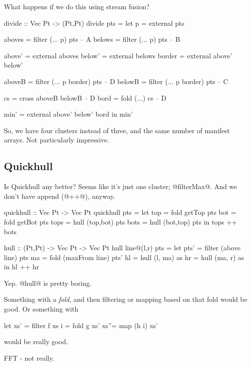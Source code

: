 What happens if we do this using stream fusion?
\begin{code}
divide :: Vec Pt -> (Pt,Pt)
divide pts
 = let p      = external pts

       aboves = filter (... p) pts          -- A
       belows = filter (... p) pts          -- B

       above' = external aboves
       below' = external belows
       border = external above' below'


       aboveB = filter (... p border) pts   -- D
       belowB = filter (... p border) pts   -- C

       cs     = cross  aboveB belowB        -- D
       bord   = fold   (...) cs             -- D

       min'   = external above' below' bord
   in  min'
\end{code}
So, we have four clusters instead of three, and the same number of manifest arrays. Not particularly impressive.

\subsection{Quickhull}
Is Quickhull any better? Seems like it's just one cluster; @filterMax@. And we don't have append (@++@), anyway.
\begin{code}
quickhull :: Vec Pt -> Vec Pt
quickhull pts
 = let top  = fold getTop pts
       bot  = fold getBot pts
       tops = hull (top,bot) pts
       bots = hull (bot,top) pts
   in  tops ++ bots

hull :: (Pt,Pt) -> Vec Pt -> Vec Pt
hull line@(l,r) pts
 = let pts' = filter (above   line) pts
       ma   = fold   (maxFrom line) pts'
       hl   = hull   (l, ma)        as
       hr   = hull   (ma, r)        as
   in  hl  ++ hr
\end{code}
Yep. @hull@ is pretty boring.

Something with a \emph{fold}, and then filtering or mapping based on that fold would be good.
Or something with
\begin{code}
let xs' = filter f    xs
    i   = fold   g    xs'
    xs''= map   (h i) xs'
\end{code}
would be really good.

FFT - not really.

